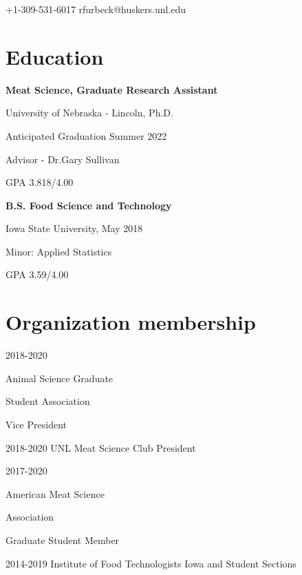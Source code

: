 \documentclass{tccv}
\begin{document}
    {+1-309-531-6017}
    {rfurbeck@huskers.unl.edu}

\section{Education}

\textbf{Meat Science, Graduate Research Assistant}

{  University of Nebraska - Lincoln, Ph.D.}

{Anticipated Graduation Summer 2022}

{Advisor - Dr.Gary Sullivan}

{GPA 3.818/4.00}


\vspace{2mm}

    \textbf{B.S. Food Science and Technology}

{  Iowa State University, May 2018}

{Minor: Applied Statistics}

{GPA 3.59/4.00}

\section{Organization membership}

\begin{yearlist}

\item{2018-2020}
    {Animal Science Graduate

    Student Association}
    {Vice President}

\item{2018-2020}
    {UNL Meat Science Club}
    {President}

\item{2017-2020}
     {American Meat Science

     Association}
     {Graduate Student Member}

     \item{2014-2019}
     {Institute of Food Technologists}
     {Iowa and Student Sections}







\end{yearlist}
\end{document}
